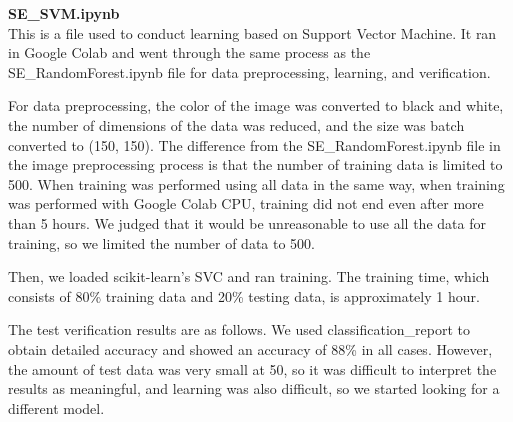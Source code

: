 \textbf{SE\_SVM.ipynb} \\
This is a file used to conduct learning based on Support Vector Machine. It ran in Google Colab and went through the same process as the SE\_RandomForest.ipynb file for data preprocessing, learning, and verification.

For data preprocessing, the color of the image was converted to black and white, the number of dimensions of the data was reduced, and the size was batch converted to (150, 150). The difference from the SE\_RandomForest.ipynb file in the image preprocessing process is that the number of training data is limited to 500. When training was performed using all data in the same way, when training was performed with Google Colab CPU, training did not end even after more than 5 hours. We judged that it would be unreasonable to use all the data for training, so we limited the number of data to 500.

Then, we loaded scikit-learn's SVC and ran training. The training time, which consists of 80\% training data and 20\% testing data, is approximately 1 hour.


The test verification results are as follows. We used classification\_report to obtain detailed accuracy and showed an accuracy of 88\% in all cases. However, the amount of test data was very small at 50, so it was difficult to interpret the results as meaningful, and learning was also difficult, so we started looking for a different model.

